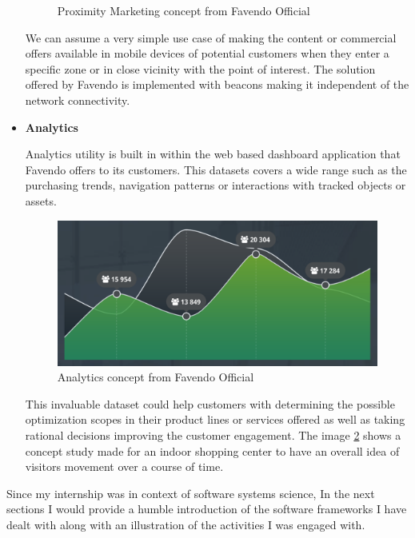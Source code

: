 \begin{itemize}
\begin{figure}[H]
	 	\caption{Proximity Marketing concept from Favendo Official \cite{favendoataglance}}
	 	\label{figure:proximitymarketing_concept}
	 \end{figure}
 	\par We can assume a very simple use case of making the content or commercial offers available in mobile devices of potential customers when they enter a specific zone or in close vicinity with the point of interest. The solution offered by Favendo is implemented with beacons making it independent of the network connectivity.
 	\item \textbf{Analytics}
 	\par Analytics utility is built in within the web based dashboard application that Favendo offers to its customers. This datasets covers a wide range such as the purchasing trends, navigation patterns or interactions with tracked objects or assets.
 	\begin{figure}[H]
 		\centering
 		\includegraphics[scale = 0.5]{images/analytics}
 		\caption{Analytics concept from Favendo Official \cite{favendoataglance}}
 		\label{figure:analytics_concept}
 	\end{figure}
 	\par This invaluable dataset could help customers with determining the possible optimization scopes in their product lines or services offered as well as taking rational decisions improving the customer engagement. The image \ref{figure:analytics_concept} shows a concept study made for an indoor shopping center to have an overall idea of visitors movement over a course of time.
\end{itemize}

\par Since my internship was in context of software systems science, In the next sections I would provide a humble introduction of the software frameworks I have dealt with along with an illustration of the activities I was engaged with.



